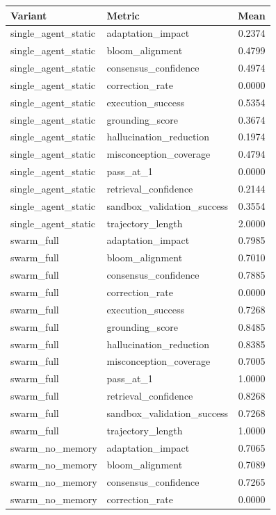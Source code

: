 \begin{tabular}{llr}
\toprule
Variant & Metric & Mean \\
\midrule
single_agent_static & adaptation\_impact & 0.2374 \\
single_agent_static & bloom\_alignment & 0.4799 \\
single_agent_static & consensus\_confidence & 0.4974 \\
single_agent_static & correction\_rate & 0.0000 \\
single_agent_static & execution\_success & 0.5354 \\
single_agent_static & grounding\_score & 0.3674 \\
single_agent_static & hallucination\_reduction & 0.1974 \\
single_agent_static & misconception\_coverage & 0.4794 \\
single_agent_static & pass\_at\_1 & 0.0000 \\
single_agent_static & retrieval\_confidence & 0.2144 \\
single_agent_static & sandbox\_validation\_success & 0.3554 \\
single_agent_static & trajectory\_length & 2.0000 \\
swarm_full & adaptation\_impact & 0.7985 \\
swarm_full & bloom\_alignment & 0.7010 \\
swarm_full & consensus\_confidence & 0.7885 \\
swarm_full & correction\_rate & 0.0000 \\
swarm_full & execution\_success & 0.7268 \\
swarm_full & grounding\_score & 0.8485 \\
swarm_full & hallucination\_reduction & 0.8385 \\
swarm_full & misconception\_coverage & 0.7005 \\
swarm_full & pass\_at\_1 & 1.0000 \\
swarm_full & retrieval\_confidence & 0.8268 \\
swarm_full & sandbox\_validation\_success & 0.7268 \\
swarm_full & trajectory\_length & 1.0000 \\
swarm_no_memory & adaptation\_impact & 0.7065 \\
swarm_no_memory & bloom\_alignment & 0.7089 \\
swarm_no_memory & consensus\_confidence & 0.7265 \\
swarm_no_memory & correction\_rate & 0.0000 \\

\end{tabular}
